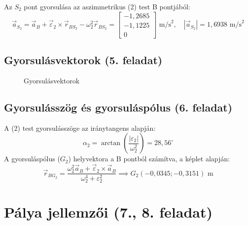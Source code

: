 \documentclass[fleqn,12pt]{article}
\begin{document}
Az $S_2$ pont gyorsulása az aszimmetrikus (2) test B pontjából:
\begin{equation}
    \vec{a}_{S_2} = \vec{a}_B + \vec{\varepsilon}_2 \times \vec{r}_{BS_2} - \omega_2^2 \vec{r}_{BS_2} = \begin{bmatrix} -1,2685 \\ -1,1225 \\ 0 \end{bmatrix} \text{ m/s}^2, \quad |\vec{a}_{S_2}| = 1,6938 \text{ m/s}^2
\end{equation}

\subsection{Gyorsulásvektorok (5. feladat)}
\begin{figure}[H]
    \centering
    
    \caption{Gyorsulásvektorok}
\end{figure}

\subsection{Gyorsulásszög és gyorsuláspólus (6. feladat)}
A (2) test gyorsulásszöge az iránytangens alapján:
\begin{equation}
    \alpha_2 = \arctan \left( \frac{|\varepsilon_2|}{\omega_2^2} \right) = 28,56^\circ
\end{equation}
A gyorsuláspólus ($G_2$) helyvektora a B pontból számítva, a képlet alapján:
\begin{equation}
    \vec{r}_{BG_2} = \frac{\omega_2^2 \vec{a}_B + \vec{\varepsilon}_2 \times \vec{a}_B}{\omega_2^4 + \varepsilon_2^2} \implies G_2(-0,0345; -0,3151) \text{ m}
\end{equation}

\section{Pálya jellemzői (7., 8. feladat)}
\end{document}
